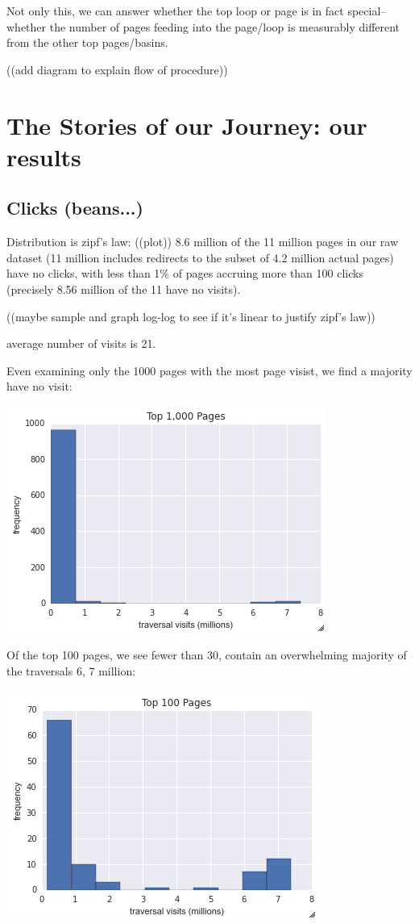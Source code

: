 \documentclass[twoside]{article}
\begin{document}
\begin{multicols}{2}
Not only this, we can answer whether the top loop or page is in fact special--whether the number of pages feeding into the page/loop is measurably different from the other top pages/basins.

((add diagram to explain flow of procedure))


\section{The Stories of our Journey: our results}

\subsection{Clicks (beans...)}
Distribution is zipf's law:
((plot))
8.6 million of the 11 million pages in our raw dataset (11 million includes redirects to the subset of 4.2 million actual pages) have no clicks, with less than 1\% of pages accruing more than 100 clicks (precisely 8.56 million of the 11 have no visits).

((maybe sample and graph log-log to see if it's linear to justify zipf's law))

average number of visits is 21.

Even examining only the 1000 pages with the most page visist, we find a majority have no visit:

\includegraphics[scale=0.5]{graphics/top_1k_pages.png}

Of the top 100 pages, we see fewer than 30, contain an overwhelming majority of the traversals 6, 7 million:

\includegraphics[scale=0.5]{graphics/top_100_pages.png}


\end{multicols}
\end{document}
